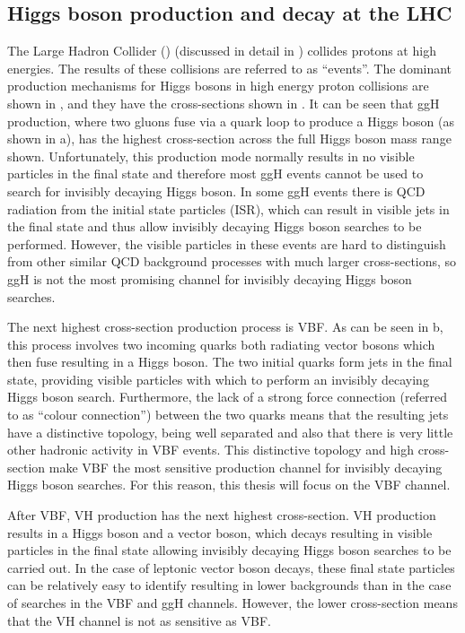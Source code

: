 \subsection{Higgs boson production and decay at the LHC}
\label{sec:higprod}
The Large Hadron Collider (\LHC) (discussed in detail in ) collides protons at high energies. The results of these collisions are referred to as ``events''. The dominant production mechanisms for Higgs bosons in high energy proton collisions are shown in , and they have the cross-sections shown in . It can be seen that \ac{ggH} production, where two gluons fuse via a quark loop to produce a Higgs boson (as shown in a), has the highest cross-section across the full Higgs boson mass range shown. Unfortunately, this production mode normally results in no visible particles in the final state and therefore most \ac{ggH} events cannot be used to search for invisibly decaying Higgs boson. In some \ac{ggH} events there is \ac{QCD} radiation from the initial state particles (\ac{ISR}), which can result in visible jets in the final state and thus allow invisibly decaying Higgs boson searches to be performed. However, the visible particles in these events are hard to distinguish from other similar \ac{QCD} background processes with much larger cross-sections, so \ac{ggH} is not the most promising channel for invisibly decaying Higgs boson searches.

The next highest cross-section production process is \ac{VBF}. As can be seen in b, this process involves two incoming quarks both radiating vector bosons which then fuse resulting in a Higgs boson. The two initial quarks form jets in the final state, providing visible particles with which to perform an invisibly decaying Higgs boson search. Furthermore, the lack of a strong force connection (referred to as ``colour connection'') between the two quarks means that the resulting jets have a distinctive topology, being well separated and also that there is very little other hadronic activity in \ac{VBF} events. This distinctive topology and high cross-section make \ac{VBF} the most sensitive production channel for invisibly decaying Higgs boson searches. For this reason, this thesis will focus on the \ac{VBF} channel.

After \ac{VBF}, \ac{VH} production has the next highest cross-section. \ac{VH} production results in a Higgs boson and a vector boson, which decays resulting in visible particles in the final state allowing invisibly decaying Higgs boson searches to be carried out. In the case of leptonic vector boson decays, these final state particles can be relatively easy to identify resulting in lower backgrounds than in the case of searches in the \ac{VBF} and \ac{ggH} channels. However, the lower cross-section means that the \ac{VH} channel is not as sensitive as \ac{VBF}.

